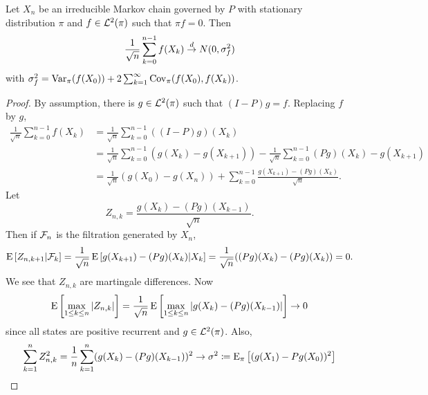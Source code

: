 \begin{theorem}
    Let $X_n$ be an irreducible Markov chain governed by $P$ with 
    stationary distribution $\pi$ and $f\in\mathcal{L}^2(\pi)$ such that 
    $\pi f = 0$. Then 
    \begin{equation*}
        \frac{1}{\sqrt{n}}\sum_{k=0}^{n-1} f(X_k) \overset{d}{\to} N(0, \sigma_f^2)
    \end{equation*}
    with $\sigma_f^2 = \operatorname{Var}_\pi(f(X_0)) + 2\sum_{k=1}^{\infty}\operatorname{Cov}_\pi(f(X_0), f(X_k))$. 
\end{theorem}
\begin{proof}
    By assumption, there is $g\in \mathcal{L}^2(\pi)$ such that $(I-P)g = f$. Replacing 
    $f$ by $g$, 
    \begin{equation*}
        \begin{split}
            \frac{1}{\sqrt{n}}\sum_{k=0}^{n-1} f(X_k) &= \frac{1}{\sqrt{n}}\sum_{k=0}^{n-1}((I-P)g)(X_{k}) \\
            &= \frac{1}{\sqrt{n}}\sum_{k=0}^{n-1}(g(X_k) - g(X_{k+1})) - \frac{1}{\sqrt{n}}\sum_{k=0}^{n-1}(Pg)(X_{k}) - g(X_{k+1}) \\ 
            &= \frac{1}{\sqrt{n}}(g(X_0) - g(X_n)) + \sum_{k=0}^{n-1}\frac{g(X_{k+1}) - (Pg)(X_{k})}{\sqrt{n}}. 
        \end{split}
    \end{equation*}
    Let 
    \begin{equation*}
        Z_{n,k} = \frac{g(X_{k}) - (Pg)(X_{k-1})}{\sqrt{n}}. 
    \end{equation*}
    Then if $\mathcal{F}_n$ is the filtration generated by $X_n$, 
    \begin{equation*}
        \E\sbrc{Z_{n,{k+1}}|\F_k} = \frac{1}{\sqrt{n}}\E\sbrc{g(X_{k+1}) - (Pg)(X_k)|X_k} 
        = \frac{1}{\sqrt{n}}\pth{(Pg)(X_k) - (Pg)(X_k)} = 0. 
    \end{equation*}
    We see that $Z_{n,k}$ are martingale differences. Now 
    \begin{equation*}
        \operatorname{E}\left[ {\max_{1\leq k\leq n}\left\lvert {Z_{n,k}} \right\rvert} \right] = \frac{1}{\sqrt{n}}\operatorname{E}\left[ {\max_{1\leq k\leq n}\left\lvert {g(X_{k}) - (Pg)(X_{k-1})} \right\rvert} \right]\to 0
    \end{equation*}
    since all states are positive recurrent and $g\in\mathcal{L}^2(\pi)$. Also, 
    \begin{equation*}
        \sum_{k=1}^nZ_{n,k}^2 = \frac{1}{n}\sum_{k=1}^n(g(X_k) - (Pg)(X_{k-1}))^2 
        \to \sigma^2\coloneq \operatorname{E}_\pi\left[ {(g(X_1) - Pg(X_0))^2} \right]
    \end{equation*}

\end{proof}
